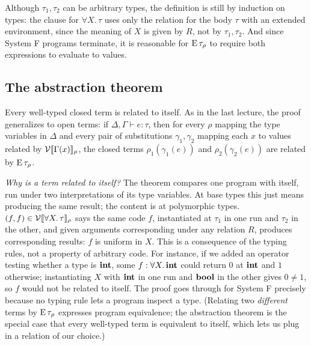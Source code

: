 Although $\tau_1, \tau_2$ can be arbitrary types, the definition is still by induction
on types: the clause for $\forall X.\, \tau$ uses only the relation for the body $\tau$
with an extended environment, since the meaning of $X$ is given by $R$, not by
$\tau_1, \tau_2$. And since System F programs terminate, it is reasonable for
$\operatorname{E}{\tau}_\rho$ to require both expressions to evaluate to values.
 
\subsection{The abstraction theorem}
 
 
Every well-typed closed term is related to itself. As in the last lecture, the proof
generalizes to open terms: if $\Delta, \Gamma \vdash e : \tau$, then for every $\rho$
mapping the type variables in $\Delta$ and every pair of substitutions $\gamma_1,
\gamma_2$ mapping each $x$ to values related by $\mathcal{V}[\![\Gamma(x)]\!]_\rho$, the closed terms
$\rho_1(\gamma_1(e))$ and $\rho_2(\gamma_2(e))$ are related by $\operatorname{E}{\tau}_\rho$.
 
 
\emph{Why is a term related to itself?} The theorem compares one program with itself,
run under two interpretations of its type variables. At base types this just means
producing the same result; the content is at polymorphic types. $(f, f) \in
\mathcal{V}[\![\forall X.\, \tau]\!]_\rho$ says the same code $f$, instantiated at $\tau_1$ in one run
and $\tau_2$ in the other, and given arguments corresponding under any relation $R$,
produces corresponding results: $f$ is uniform in $X$. This is a consequence of the
typing rules, not a property of arbitrary code. For instance, if we added an operator
testing whether a type is $\mathbf{int}$, some $f : \forall X.\, \mathbf{int}$ could return $0$
at $\mathbf{int}$ and $1$ otherwise; instantiating $X$ with $\mathbf{int}$ in one run and
$\mathbf{bool}$ in the other gives $0 \neq 1$, so $f$ would not be related to itself. The
proof goes through for System F precisely because no typing rule lets a program inspect
a type. (Relating two \emph{different} terms by $\operatorname{E}{\tau}_\rho$ expresses program
equivalence; the abstraction theorem is the special case that every well-typed term is
equivalent to itself, which lets us plug in a relation of our choice.)
 
